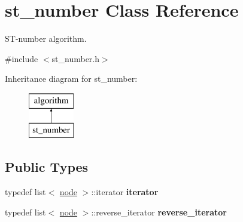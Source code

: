 \hypertarget{classst__number}{}\section{st\+\_\+number Class Reference}
\label{classst__number}


S\+T-\/number algorithm.  




{\ttfamily \#include $<$st\+\_\+number.\+h$>$}

Inheritance diagram for st\+\_\+number\+:\begin{figure}[H]
\begin{center}
\leavevmode
\includegraphics[height=2.000000cm]{classst__number}
\end{center}
\end{figure}
\subsection*{Public Types}
\begin{DoxyCompactItemize}
\item 
\mbox{\label{classst__number_aaed068377f71f1901942f623086c6106}} 
typedef list$<$ \mbox{\hyperlink{classnode}{node}} $>$\+::iterator {\bfseries iterator}
\item 
\mbox{\label{classst__number_a2029accd27725f982c898b0220e625af}} 
typedef list$<$ \mbox{\hyperlink{classnode}{node}} $>$\+::reverse\+\_\+iterator {\bfseries reverse\+\_\+iterator}
\end{DoxyCompactItemize}
